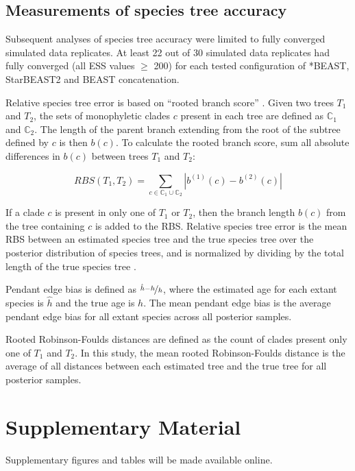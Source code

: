 \documentclass[nogrid]{MBE}%
\begin{document}
\subsection{Measurements of species tree accuracy}

Subsequent analyses of species tree accuracy were limited to fully converged
simulated data replicates. At least 22 out of 30 simulated data replicates had
fully converged (all ESS values $\ge$ 200) for each tested configuration of
*BEAST, StarBEAST2 and BEAST concatenation.

Relative species tree error is based on ``rooted branch score''
\citep[RBS;][]{Heled2013}. Given two trees $T_1$ and $T_2$, the sets of
monophyletic clades $c$ present in each tree are defined as $\mathbb{C}_1$ and
$\mathbb{C}_2$. The length of the parent branch extending from the root of the
subtree defined by $c$ is then $b(c)$. To calculate the rooted branch score, sum
all absolute differences in $b(c)$ between trees $T_1$ and $T_2$:

\begin{equation}
RBS(T_1, T_2) = \sum_{c \in {\mathbb{C}_1} \cup {\mathbb{C}_2}} |b^{(1)}(c) - b^{(2)}(c)|
\end{equation}

If a clade $c$ is present in only one of $T_1$ or $T_2$, then the branch length
$b(c)$ from the tree containing $c$ is added to the RBS. Relative species tree
error is the mean RBS between an estimated species tree and the true
species tree over the posterior distribution of species trees, and is normalized
by dividing by the total length of the true species tree
\citep{Ogilvie01052016}.

Pendant edge bias is defined as $\nicefrac{\hat{h} - h}{h}$, where the estimated
age for each extant species is $\hat{h}$ and the true age is $h$. The mean
pendant edge bias is the average pendant edge bias for all extant species across
all posterior samples.

Rooted Robinson-Foulds distances \citep{ROBINSON1981131} are defined as the
count of clades present only one of $T_1$ and $T_2$. In this study, the mean
rooted Robinson-Foulds distance is the average of all distances between each
estimated tree and the true tree for all posterior samples.

\section{Supplementary Material}
Supplementary figures and tables will be made available online.
\end{document}
